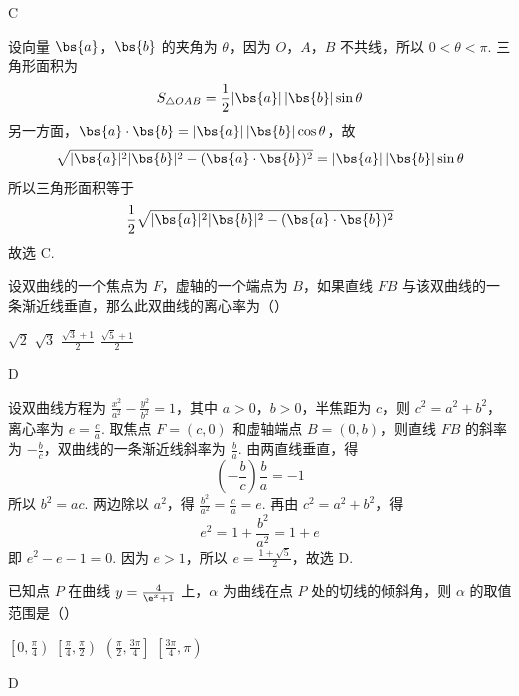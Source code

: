 \begin{answer}
C
\end{answer}

\begin{solution}
设向量 \(\bs{a}\)，\(\bs{b}\) 的夹角为 \(\theta\)，因为 \(O\)，\(A\)，\(B\) 不共线，所以 \(0<\theta<\pi\). 三角形面积为
\[
S_{\triangle OAB}=\frac{1}{2}|\bs{a}|\,|\bs{b}|\sin\theta
\]
另一方面，\(\bs{a}\cdot\bs{b}=|\bs{a}|\,|\bs{b}|\cos\theta\)，故
\[
\sqrt{|\bs{a}|^{2}|\bs{b}|^{2}-(\bs{a}\cdot\bs{b})^{2}}=|\bs{a}|\,|\bs{b}|\sin\theta
\]
所以三角形面积等于
\[
\frac{1}{2}\sqrt{|\bs{a}|^{2}|\bs{b}|^{2}-(\bs{a}\cdot\bs{b})^{2}}
\]
故选 C.
\end{solution}

\begin{problem}
设双曲线的一个焦点为 \(F\)，虚轴的一个端点为 \(B\)，如果直线 \(FB\) 与该双曲线的一条渐近线垂直，那么此双曲线的离心率为（\quad）

\choices
    {\(\sqrt{2}\)}
    {\(\sqrt{3}\)}
    {\(\frac{\sqrt{3} + 1}{2}\)}
    {\(\frac{\sqrt{5} + 1}{2}\)}
\end{problem}

\begin{answer}
D
\end{answer}

\begin{solution}
设双曲线方程为 \(\frac{x^{2}}{a^{2}}-\frac{y^{2}}{b^{2}}=1\)，其中 \(a>0\)，\(b>0\)，半焦距为 \(c\)，则 \(c^{2}=a^{2}+b^{2}\)，离心率为 \(e=\frac{c}{a}\). 取焦点 \(F=(c,0)\) 和虚轴端点 \(B=(0,b)\)，则直线 \(FB\) 的斜率为 \(-\frac{b}{c}\)，双曲线的一条渐近线斜率为 \(\frac{b}{a}\). 由两直线垂直，得
\[
\left(-\frac{b}{c}\right)\frac{b}{a}=-1
\]
所以 \(b^{2}=ac\).
两边除以 \(a^{2}\)，得 \(\frac{b^{2}}{a^{2}}=\frac{c}{a}=e\). 再由 \(c^{2}=a^{2}+b^{2}\)，得
\[
e^{2}=1+\frac{b^{2}}{a^{2}}=1+e
\]
即 \(e^{2}-e-1=0\).
因为 \(e>1\)，所以 \(e=\frac{1+\sqrt{5}}{2}\)，故选 D.
\end{solution}

\begin{problem}
已知点 \(P\) 在曲线 \(y = \frac{4}{\e^{x} + 1}\) 上，\(\alpha\) 为曲线在点 \(P\) 处的切线的倾斜角，则 \(\alpha\) 的取值范围是（\quad）

\choices
    {\(\left[0, \frac{\pi}{4}\right)\)}
    {\(\left[\frac{\pi}{4}, \frac{\pi}{2}\right)\)}
    {\(\left(\frac{\pi}{2}, \frac{3\pi}{4}\right]\)}
    {\(\left[\frac{3\pi}{4}, \pi\right)\)}
\end{problem}

\begin{answer}
D
\end{answer}

